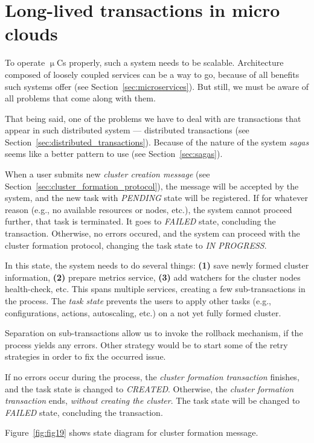 \section{Long-lived transactions in micro clouds}\label{sec:long_live_transactions}
%
To operate $\upmu$Cs properly, such a system needs to be scalable. Architecture composed of loosely coupled services can be a way to go, because of all benefits such systems offer (see Section~\ref{sec:microservices}). But still, we must be aware of all problems that come along with them.

That being said, one of the problems we have to deal with are transactions that appear in such distributed system --- distributed transactions (see Section~\ref{sec:distributed_transactions}). Because of the nature of the system \emph{sagas} seems like a better pattern to use (see Section~\ref{sec:sagas}).

When a user submits new \emph{cluster creation message} (see Section~\ref{sec:cluster_formation_protocol}), the message will be accepted by the system, and the new task with \emph{PENDING} state will be registered. If for whatever reason (e.g., no available resources or nodes, etc.), the system cannot proceed further, that task is terminated. It goes to \emph{FAILED} state, concluding the transaction. Otherwise, no errors occured, and the system can proceed with the cluster formation protocol, changing the task state to \emph{IN PROGRESS}.

In this state, the system needs to do several things: \textbf{(1)} save newly formed cluster information, \textbf{(2)} prepare metrics service, \textbf{(3)} add watchers for the cluster nodes health-check, etc. This spans multiple services, creating a few sub-transactions in the process. The \emph{task state} prevents the users to apply other tasks (e.g., configurations, actions, autoscaling, etc.) on a not yet fully formed cluster.

Separation on sub-transactions allow us to invoke the rollback mechanism, if the process yields any errors. Other strategy would be to start some of the retry strategies in order to fix the occurred issue.

If no errors occur during the process, the \emph{cluster formation transaction} finishes, and the task state is changed to \emph{CREATED}. Otherwise, the \emph{cluster formation transaction} ends, \emph{without creating the cluster}. The task state will be changed to \emph{FAILED} state, concluding the transaction.

Figure~\ref{fig:fig19} shows state diagram for cluster formation message.

